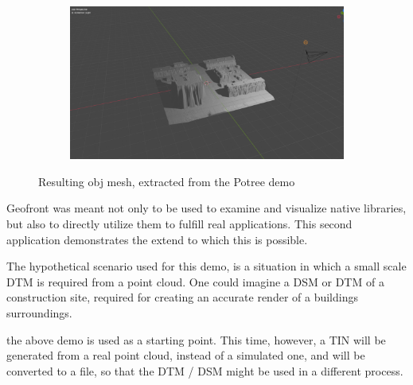 \begin{figure}
  \begin{subfigure}[b]{0.90\linewidth}
    \centering
    \includegraphics[width=\linewidth]{potree-7.PNG}
  \end{subfigure}%
  \caption{Resulting obj mesh, extracted from the Potree demo}
  \label{fig:potree-result}
\end{figure}

Geofront was meant not only to be used to examine and visualize native libraries, but also to directly utilize them to fulfill real applications.
This second application demonstrates the extend to which this is possible. 

The hypothetical scenario used for this demo, is a situation in which a small scale \ac{DTM} is required from a point cloud. 
One could imagine a \ac{DSM} or \ac{DTM} of a construction site, required for creating an accurate render of a buildings surroundings. 

the above  demo is used as a starting point. 
This time, however, a \ac{TIN} will be generated from a real point cloud, instead of a simulated one, and will be converted to a  file, so that the DTM / DSM might be used in a different process. 

